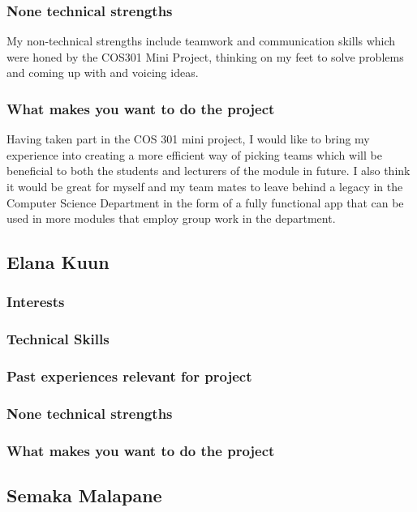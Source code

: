 \documentclass[hidelinks, 12pt, oneside]{article}
\begin{document}
\subsubsection{None technical strengths}
My non-technical strengths include teamwork and communication skills which were honed by the COS301 Mini Project, thinking on my feet to solve problems and coming up with and voicing ideas.
\subsubsection{What makes you want to do the project}
Having taken part in the COS 301 mini project, I would like to bring my experience into creating a more efficient way of picking teams which will be beneficial to both the students and lecturers of the module in future. I also think it would be great for myself and my team mates to leave behind a legacy in the Computer Science Department in the form of a fully functional app that can be used in more modules that employ group work in the department.
\subsection{Elana Kuun}
\subsubsection{Interests}
\subsubsection{Technical Skills}
\subsubsection{Past experiences relevant for project}
\subsubsection{None technical strengths}
\subsubsection{What makes you want to do the project}

\subsection{Semaka Malapane}
\end{document}
